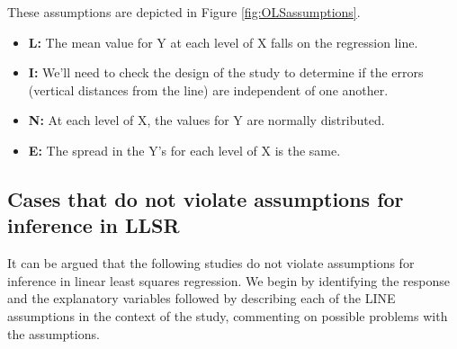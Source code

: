\documentclass[
]{krantz}
\providecommand{\tightlist}{%
  \setlength{\itemsep}{0pt}\setlength{\parskip}{0pt}}
\begin{document}
These assumptions are depicted in Figure \ref{fig:OLSassumptions}.

\begin{itemize}
\tightlist
\item
  \textbf{L:} The mean value for Y at each level of X falls on the regression line.
\item
  \textbf{I:} We'll need to check the design of the study to determine if the errors (vertical distances from the line) are independent of one another.
\item
  \textbf{N:} At each level of X, the values for Y are normally distributed.
\item
  \textbf{E:} The spread in the Y's for each level of X is the same.
\end{itemize}

\hypertarget{cases-that-do-not-violate-assumptions-for-inference-in-llsr}{%
\subsection{Cases that do not violate assumptions for inference in LLSR}\label{cases-that-do-not-violate-assumptions-for-inference-in-llsr}}

It can be argued that the following studies do not violate assumptions for inference in linear least squares regression. We begin by identifying the response and the explanatory variables followed by describing each of the LINE assumptions in the context of the study, commenting on possible problems with the assumptions.
\end{document}
